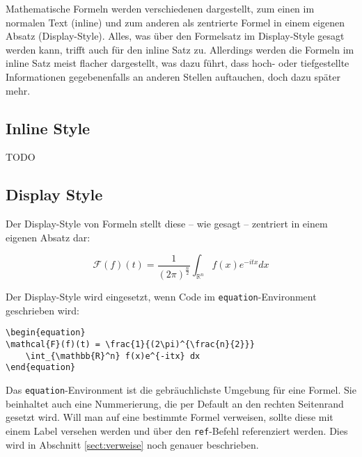 Mathematische Formeln werden verschiedenen dargestellt, zum einen im normalen Text (inline) und zum anderen als zentrierte Formel in einem eigenen Absatz (Display-Style). Alles, was über den Formelsatz im Display-Style gesagt werden kann, trifft auch für den inline Satz zu. Allerdings werden die Formeln im inline Satz meist flacher dargestellt, was dazu führt, dass hoch- oder tiefgestellte Informationen gegebenenfalls an anderen Stellen auftauchen, doch dazu später mehr.

\subsection{Inline Style} \label{sec:inline}
TODO

\subsection{Display Style}
Der Display-Style von Formeln stellt diese -- wie gesagt -- zentriert in einem eigenen Absatz dar:

\begin{equation}
\mathcal{F}(f)(t) = \frac{1}{(2\pi)^{\frac{n}{2}}} 
	\int_{\mathbb{R}^n} f(x)e^{-itx} dx
\end{equation}

Der Display-Style wird eingesetzt, wenn Code im \texttt{equation}-Environment geschrieben wird:
\begin{verbatim}
\begin{equation}
\mathcal{F}(f)(t) = \frac{1}{(2\pi)^{\frac{n}{2}}} 
	\int_{\mathbb{R}^n} f(x)e^{-itx} dx
\end{equation}
\end{verbatim}
Das \texttt{equation}-Environment ist die gebräuchlichste Umgebung für eine Formel. Sie beinhaltet auch eine Nummerierung, die per Default an den rechten Seitenrand gesetzt wird. Will man auf eine bestimmte Formel verweisen, sollte diese mit einem Label versehen werden und über den \texttt{ref}-Befehl referenziert werden. Dies wird in Abschnitt \ref{sect:verweise} noch genauer beschrieben.

